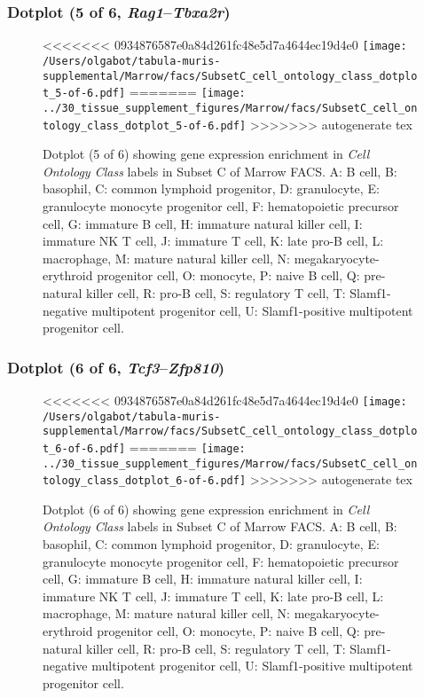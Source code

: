 \clearpage

\subsubsection{Dotplot (5 of 6, \emph{Rag1}--\emph{Tbxa2r})}
\begin{figure}[h]
\centering
<<<<<<< 0934876587e0a84d261fc48e5d7a4644ec19d4e0
\texttt{[image: /Users/olgabot/tabula-muris-supplemental/Marrow/facs/SubsetC\_cell\_ontology\_class\_dotplot\_5-of-6.pdf]}
=======
\texttt{[image: ../30\_tissue\_supplement\_figures/Marrow/facs/SubsetC\_cell\_ontology\_class\_dotplot\_5-of-6.pdf]}
>>>>>>> autogenerate tex

\caption{ Dotplot (5 of 6)  showing gene expression enrichment in \emph{Cell Ontology Class} labels in Subset C of Marrow FACS. A: B cell, B: basophil, C: common lymphoid progenitor, D: granulocyte, E: granulocyte monocyte progenitor cell, F: hematopoietic precursor cell, G: immature B cell, H: immature natural killer cell, I: immature NK T cell, J: immature T cell, K: late pro-B cell, L: macrophage, M: mature natural killer cell, N: megakaryocyte-erythroid progenitor cell, O: monocyte, P: naive B cell, Q: pre-natural killer cell, R: pro-B cell, S: regulatory T cell, T: Slamf1-negative multipotent progenitor cell, U: Slamf1-positive multipotent progenitor cell.}
\end{figure}


\clearpage

\subsubsection{Dotplot (6 of 6, \emph{Tcf3}--\emph{Zfp810})}
\begin{figure}[h]
\centering
<<<<<<< 0934876587e0a84d261fc48e5d7a4644ec19d4e0
\texttt{[image: /Users/olgabot/tabula-muris-supplemental/Marrow/facs/SubsetC\_cell\_ontology\_class\_dotplot\_6-of-6.pdf]}
=======
\texttt{[image: ../30\_tissue\_supplement\_figures/Marrow/facs/SubsetC\_cell\_ontology\_class\_dotplot\_6-of-6.pdf]}
>>>>>>> autogenerate tex

\caption{ Dotplot (6 of 6)  showing gene expression enrichment in \emph{Cell Ontology Class} labels in Subset C of Marrow FACS. A: B cell, B: basophil, C: common lymphoid progenitor, D: granulocyte, E: granulocyte monocyte progenitor cell, F: hematopoietic precursor cell, G: immature B cell, H: immature natural killer cell, I: immature NK T cell, J: immature T cell, K: late pro-B cell, L: macrophage, M: mature natural killer cell, N: megakaryocyte-erythroid progenitor cell, O: monocyte, P: naive B cell, Q: pre-natural killer cell, R: pro-B cell, S: regulatory T cell, T: Slamf1-negative multipotent progenitor cell, U: Slamf1-positive multipotent progenitor cell.}
\end{figure}


